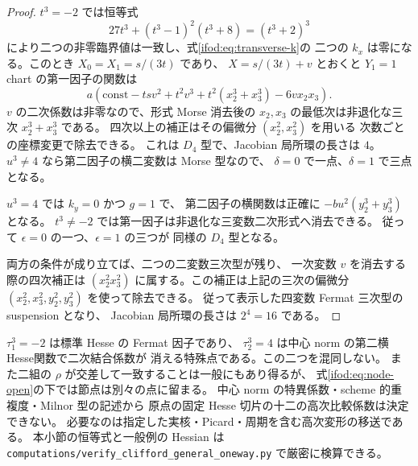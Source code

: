 \begin{proof}
$t^3=-2$ では恒等式
\[
 27t^3+(t^3-1)^2(t^3+8)=(t^3+2)^3
\]
により二つの非零臨界値は一致し、式\eqref{ifod:eq:transverse-k}の
二つの $k_x$ は零になる。このとき $X_0=X_1=s/(3t)$ であり、
$X=s/(3t)+v$ とおくと $Y_1=1$ chart の第一因子の関数は
\[
 a\left(\mathrm{const}-tsv^2+t^2v^3
       +t^2(x_2^3+x_3^3)-6vx_2x_3\right).
\]
$v$ の二次係数は非零なので、形式 Morse 消去後の
$x_2,x_3$ の最低次は非退化な三次 $x_2^3+x_3^3$ である。
四次以上の補正はその偏微分 $(x_2^2,x_3^2)$ を用いる
次数ごとの座標変更で除去できる。
これは $D_4$ 型で、Jacobian 局所環の長さは $4$。
$u^3\ne4$ なら第二因子の横二変数は Morse 型なので、
$\delta=0$ で一点、$\delta=1$ で三点となる。

$u^3=4$ では $k_y=0$ かつ $g=1$ で、
第二因子の横関数は正確に $-bu^2(y_2^3+y_3^3)$ となる。
$t^3\ne-2$ では第一因子は非退化な三変数二次形式へ消去できる。
従って $\epsilon=0$ の一つ、$\epsilon=1$ の三つが
同様の $D_4$ 型となる。

両方の条件が成り立てば、二つの二変数三次型が残り、
一次変数 $v$ を消去する際の四次補正は
$(x_2^2x_3^2)$ に属する。この補正は上記の三次の偏微分
$(x_2^2,x_3^2,y_2^2,y_3^2)$ を使って除去できる。
従って表示した四変数 Fermat 三次型の suspension となり、
Jacobian 局所環の長さは $2^4=16$ である。
\end{proof}

\begin{remark}[規約と高次比較の残存問題]
\label{ifod:rem:scope}
$\tau_1^3=-2$ は標準 Hesse の Fermat 因子であり、
$\tau_2^3=4$ は中心 norm の第二横Hesse関数で二次結合係数が
消える特殊点である。この二つを混同しない。
また二組の $\rho$ が交差して一致することは一般にもあり得るが、
式\eqref{ifod:eq:node-open}の下では節点は別々の点に留まる。
中心 norm の特異係数・scheme 的重複度・Milnor 型の記述から
原点の固定 Hesse 切片の十二の高次比較係数は決定できない。
必要なのは指定した実核・Picard・周期を含む高次変形の移送である。
本小節の恒等式と一般例の Hessian は
\texttt{computations/verify\_clifford\_general\_oneway.py}
で厳密に検算できる。
\end{remark}
